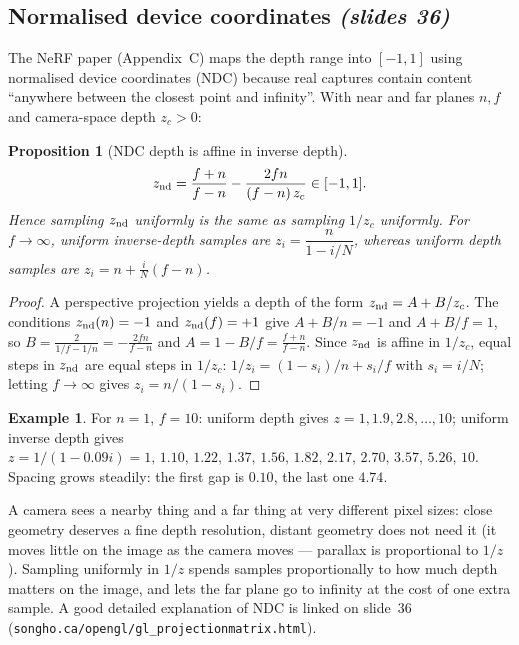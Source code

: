 \documentclass[11pt,a4paper]{article}
\newcommand{\sref}[1]{\texorpdfstring{\emph{(slides #1)}}{(slides #1)}}
\theoremstyle{definition}
\newtheorem{example}[definition]{Example}
\theoremstyle{plain}
\newtheorem{proposition}[definition]{Proposition}
\theoremstyle{remark}
\begin{document}
\subsection{Normalised device coordinates \sref{36}}

The NeRF paper (Appendix~C) maps the depth range into $[-1,1]$ using normalised device coordinates (NDC) because real captures contain content ``anywhere between the closest point and infinity''. With near and far planes $n,f$ and camera-space depth $z_c>0$:

\begin{proposition}[NDC depth is affine in inverse depth]\label{prop:ndc}
\[
z_{\rm nd}=\frac{f+n}{f-n}-\frac{2fn}{(f-n)\,z_c}\in[-1,1].
\]
Hence sampling $z_{\rm nd}$ uniformly is the same as sampling $1/z_c$ uniformly. For $f\to\infty$, uniform inverse-depth samples are $z_i=\dfrac{n}{1-i/N}$, whereas uniform depth samples are $z_i=n+\frac iN(f-n)$.
\end{proposition}
\begin{proof}
A perspective projection yields a depth of the form $z_{\rm nd}=A+B/z_c$. The conditions $z_{\rm nd}(n)=-1$ and $z_{\rm nd}(f)=+1$ give $A+B/n=-1$ and $A+B/f=1$, so $B=\frac{2}{1/f-1/n}=-\frac{2fn}{f-n}$ and $A=1-B/f=\frac{f+n}{f-n}$. Since $z_{\rm nd}$ is affine in $1/z_c$, equal steps in $z_{\rm nd}$ are equal steps in $1/z_c$: $1/z_i=(1-s_i)/n+s_i/f$ with $s_i=i/N$; letting $f\to\infty$ gives $z_i=n/(1-s_i)$.
\end{proof}

\begin{example}
For $n=1$, $f=10$: uniform depth gives $z=1,1.9,2.8,\dots,10$; uniform inverse depth gives $z=1/(1-0.09i)=1,\,1.10,\,1.22,\,1.37,\,1.56,\,1.82,\,2.17,\,2.70,\,3.57,\,5.26,\,10$. Spacing grows steadily: the first gap is $0.10$, the last one $4.74$.
\end{example}

\begin{intuition}
A camera sees a nearby thing and a far thing at very different pixel sizes: close geometry deserves a fine depth resolution, distant geometry does not need it (it moves little on the image as the camera moves --- parallax is proportional to $1/z$). Sampling uniformly in $1/z$ spends samples proportionally to how much depth matters on the image, and lets the far plane go to infinity at the cost of one extra sample. A good detailed explanation of NDC is linked on slide~36 (\texttt{songho.ca/opengl/gl\_projectionmatrix.html}).
\end{intuition}
\end{document}

